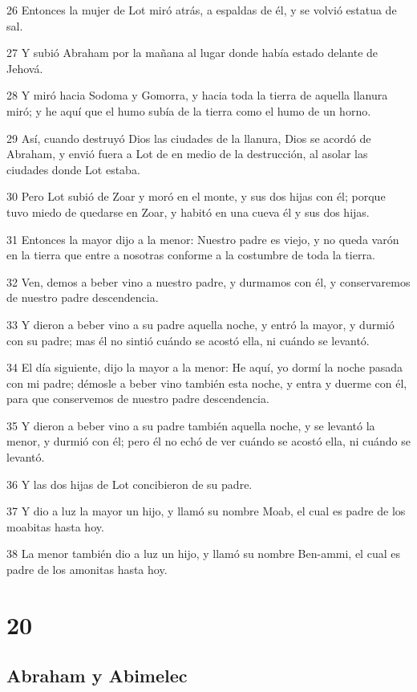 \par 26 Entonces la mujer de Lot miró atrás, a espaldas de él, y se volvió estatua de sal.
\par 27 Y subió Abraham por la mañana al lugar donde había estado delante de Jehová.
\par 28 Y miró hacia Sodoma y Gomorra, y hacia toda la tierra de aquella llanura miró; y he aquí que el humo subía de la tierra como el humo de un horno.
\par 29 Así, cuando destruyó Dios las ciudades de la llanura, Dios se acordó de Abraham, y envió fuera a Lot de en medio de la destrucción, al asolar las ciudades donde Lot estaba.
\par 30 Pero Lot subió de Zoar y moró en el monte, y sus dos hijas con él; porque tuvo miedo de quedarse en Zoar, y habitó en una cueva él y sus dos hijas.
\par 31 Entonces la mayor dijo a la menor: Nuestro padre es viejo, y no queda varón en la tierra que entre a nosotras conforme a la costumbre de toda la tierra.
\par 32 Ven, demos a beber vino a nuestro padre, y durmamos con él, y conservaremos de nuestro padre descendencia.
\par 33 Y dieron a beber vino a su padre aquella noche, y entró la mayor, y durmió con su padre; mas él no sintió cuándo se acostó ella, ni cuándo se levantó.
\par 34 El día siguiente, dijo la mayor a la menor: He aquí, yo dormí la noche pasada con mi padre; démosle a beber vino también esta noche, y entra y duerme con él, para que conservemos de nuestro padre descendencia.
\par 35 Y dieron a beber vino a su padre también aquella noche, y se levantó la menor, y durmió con él; pero él no echó de ver cuándo se acostó ella, ni cuándo se levantó.
\par 36 Y las dos hijas de Lot concibieron de su padre.
\par 37 Y dio a luz la mayor un hijo, y llamó su nombre Moab, el cual es padre de los moabitas hasta hoy.
\par 38 La menor también dio a luz un hijo, y llamó su nombre Ben-ammi, el cual es padre de los amonitas hasta hoy.

\chapter{20}

\section*{Abraham y Abimelec}

